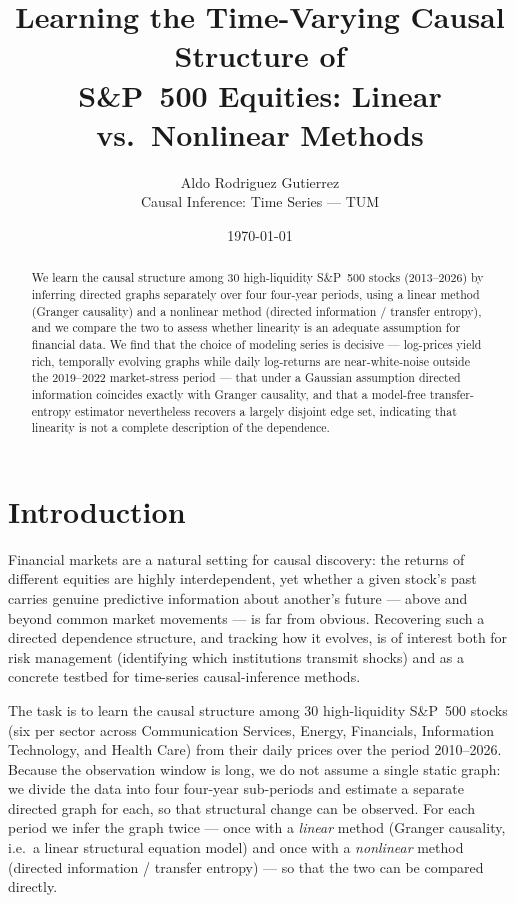 \documentclass[11pt,a4paper]{article}
\title{\textbf{Learning the Time-Varying Causal Structure of\\
S\&P~500 Equities: Linear vs.\ Nonlinear Methods}}
\author{%
  Aldo Rodriguez Gutierrez \\
  Causal Inference: Time Series --- TUM
}
\date{\today}
\begin{document}
\maketitle

\begin{abstract}
\noindent
We learn the causal structure among 30 high-liquidity S\&P~500 stocks
(2013--2026) by inferring directed graphs separately over four four-year
periods, using a linear method (Granger causality) and a nonlinear method
(directed information / transfer entropy), and we compare the two to assess
whether linearity is an adequate assumption for financial data.
We find that the choice of modeling series is decisive --- log-prices yield rich,
temporally evolving graphs while daily log-returns are near-white-noise outside
the 2019--2022 market-stress period --- that under a Gaussian assumption directed
information coincides exactly with Granger causality, and that a model-free
transfer-entropy estimator nevertheless recovers a largely disjoint edge set,
indicating that linearity is not a complete description of the dependence.
\end{abstract}

\tableofcontents

\section{Introduction}
Financial markets are a natural setting for causal discovery: the returns of
different equities are highly interdependent, yet whether a given stock's past
carries genuine predictive information about another's future --- above and
beyond common market movements --- is far from obvious. Recovering such a
directed dependence structure, and tracking how it evolves, is of interest both
for risk management (identifying which institutions transmit shocks) and as a
concrete testbed for time-series causal-inference methods.

The task is to learn the causal structure among 30 high-liquidity S\&P~500
stocks (six per sector across Communication Services, Energy, Financials,
Information Technology, and Health Care) from their daily prices over the period
2010--2026. Because the observation window is long, we do not assume a single
static graph: we divide the data into four four-year sub-periods and estimate a
separate directed graph for each, so that structural change can be observed. For
each period we infer the graph twice --- once with a \emph{linear} method
(Granger causality, i.e.\ a linear structural equation model) and once with a
\emph{nonlinear} method (directed information / transfer entropy) --- so that the
two can be compared directly.
\end{document}
